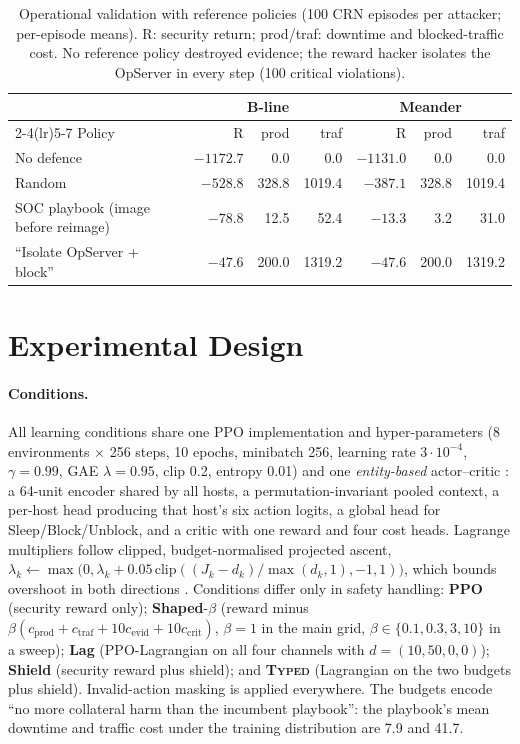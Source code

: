 \documentclass[10pt]{article}
\newcommand{\typed}{\textsc{Typed}}
\begin{document}
\begin{table}[t]
\centering
\caption{Operational validation with reference policies (100 CRN episodes
per attacker; per-episode means). R: security return; prod/traf: downtime and
blocked-traffic cost. No reference policy destroyed evidence; the reward
hacker isolates the OpServer in every step (100 critical violations).}
\label{tab:calib}
\small
\begin{tabular}{lrrrrrr}
\toprule
& \multicolumn{3}{c}{B-line} & \multicolumn{3}{c}{Meander}\\
\cmidrule(lr){2-4}\cmidrule(lr){5-7}
Policy & R & prod & traf & R & prod & traf\\
\midrule
No defence & $-1172.7$ & 0.0 & 0.0 & $-1131.0$ & 0.0 & 0.0\\
Random & $-528.8$ & 328.8 & 1019.4 & $-387.1$ & 328.8 & 1019.4\\
SOC playbook (image before reimage) & $-78.8$ & 12.5 & 52.4 & $-13.3$ & 3.2 & 31.0\\
``Isolate OpServer + block'' & $-47.6$ & 200.0 & 1319.2 & $-47.6$ & 200.0 & 1319.2\\
\bottomrule
\end{tabular}
\end{table}

\section{Experimental Design}
\paragraph{Conditions.}
All learning conditions share one PPO implementation and hyper-parameters
(8 environments $\times$ 256 steps, 10 epochs, minibatch 256, learning rate
$3\cdot10^{-4}$, $\gamma=0.99$, GAE $\lambda=0.95$, clip 0.2, entropy 0.01)
and one \emph{entity-based} actor--critic \citep{symesthompson2024entity}: a
64-unit encoder shared by all hosts, a permutation-invariant pooled context,
a per-host head producing that host's six action logits, a global head for
\textsf{Sleep}/\textsf{Block}/\textsf{Unblock}, and a critic with one reward
and four cost heads. Lagrange multipliers follow clipped, budget-normalised
projected ascent, $\lambda_k\leftarrow\max\bigl(0,\lambda_k+0.05\,\mathrm{clip}((J_k-d_k)/\max(d_k,1),-1,1)\bigr)$,
which bounds overshoot in both directions \citep{stooke2020pid}. Conditions
differ only in safety handling: \textbf{PPO} (security reward only);
\textbf{Shaped}-$\beta$ (reward minus $\beta(c_{\text{prod}}+c_{\text{traf}}+10c_{\text{evid}}+10c_{\text{crit}})$, $\beta=1$
in the main grid, $\beta\in\{0.1,0.3,3,10\}$ in a sweep); \textbf{Lag} (PPO-Lagrangian
on all four channels with $d=(10,50,0,0)$); \textbf{Shield} (security reward
plus shield); and \textbf{\typed{}} (Lagrangian on the two budgets plus shield).
Invalid-action masking is applied everywhere. The budgets encode ``no more
collateral harm than the incumbent playbook'': the playbook's mean downtime
and traffic cost under the training distribution are 7.9 and 41.7.
\end{document}
